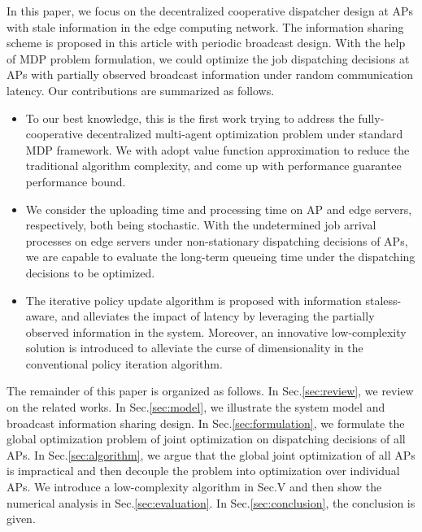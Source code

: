 In this paper, we focus on the decentralized cooperative dispatcher design at APs with stale information in the edge computing network.
The information sharing scheme is proposed in this article with periodic broadcast design.
With the help of MDP problem formulation, we could optimize the job dispatching decisions at APs with partially observed broadcast information under random communication latency.
Our contributions are summarized as follows.
\begin{itemize}
    \item To our best knowledge, this is the first work trying to address the fully-cooperative decentralized multi-agent optimization problem under standard MDP framework.
    We with adopt value function approximation to reduce the traditional algorithm complexity, and come up with performance guarantee performance bound.

    \item We consider the uploading time and processing time on AP and edge servers, respectively, both being stochastic.
    With the undetermined job arrival processes on edge servers under non-stationary dispatching decisions of APs, we are capable to evaluate the long-term queueing time under the dispatching decisions to be optimized.

    \item The iterative policy update algorithm is proposed with information staless-aware, and alleviates the impact of latency by leveraging the partially observed information in the system.
    Moreover, an innovative low-complexity solution is introduced to alleviate the curse of dimensionality in the conventional policy iteration algorithm.
\end{itemize}

The remainder of this paper is organized as follows.
In Sec.\ref{sec:review}, we review on the related works.
In Sec.\ref{sec:model}, we illustrate the system model and broadcast information sharing design.
In Sec.\ref{sec:formulation}, we formulate the global optimization problem of joint optimization on dispatching decisions of all APs.
In Sec.\ref{sec:algorithm}, we argue that the global joint optimization of all APs is impractical and then decouple the problem into optimization over individual APs.
We introduce a low-complexity algorithm in Sec.V and then show the numerical analysis in Sec.\ref{sec:evaluation}.
In Sec.\ref{sec:conclusion}, the conclusion is given.

